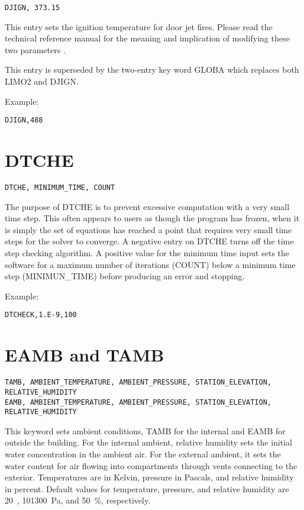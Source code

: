 \begin{lstlisting}
DJIGN, 373.15
\end{lstlisting}
This entry sets the ignition temperature for door jet fires. Please read the technical reference manual for the meaning and implication of modifying these two parameters \cite{CFAST_Tech_Guide_6}.

This entry is superseded by the two-entry key word GLOBA which replaces both LIMO2 and DJIGN.

Example:

\begin{lstlisting}
DJIGN,488
\end{lstlisting}

\section{DTCHE}

\begin{lstlisting}
DTCHE, MINIMUM_TIME, COUNT
\end{lstlisting}
The purpose of DTCHE is to prevent excessive computation with a very small time step. This often appears to users as though the program has frozen, when it is simply the set of equations has reached a point that requires very small time steps for the solver to converge. A negative entry on DTCHE turns off the time step checking algorithm. A positive value for the minimum time input sets the software for a maximum number of iterations (COUNT) below a minimum time step (MINIMUN\_TIME) before producing an error and stopping.

Example:

\begin{lstlisting}
DTCHECK,1.E-9,100
\end{lstlisting}

\section{EAMB and TAMB}

\begin{lstlisting}
TAMB, AMBIENT_TEMPERATURE, AMBIENT_PRESSURE, STATION_ELEVATION, RELATIVE_HUMIDITY
EAMB, AMBIENT_TEMPERATURE, AMBIENT_PRESSURE, STATION_ELEVATION, RELATIVE_HUMIDITY
\end{lstlisting}

This keyword sets ambient conditions, TAMB for the internal and EAMB for outside the building. For the internal ambient, relative humidity sets the initial water concentration in the ambient air.  For the external ambient, it sets the water content for air flowing into compartments through vents connecting to the exterior. Temperatures are in Kelvin, pressure in Pascals, and relative humidity in percent. Default values for temperature, pressure, and relative humidity are 20~\degc, 101300~Pa, and 50~\%, respectively.

